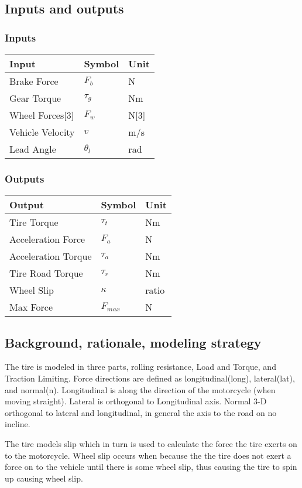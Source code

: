 \documentclass[../SimBALink.tex]{subfiles}
\begin{document}
\subsection{Inputs and outputs}
	\subsubsection{Inputs}
	\begin{tabular}{ l | l | l  }
		Input					&	Symbol		&	Unit		\\	\hline
		Brake Force				& 	$F_b$ 		&	N \\
		Gear Torque				&	$\tau_g$	&	Nm \\
		Wheel Forces[3]			&	$F_w$		&	N[3] \\
		Vehicle Velocity		&	$v$			&	m/s \\
		Lead Angle				&	$\theta_l$	&	rad \\
	\end{tabular}
	
	\subsubsection{Outputs}
	\begin{tabular}{ l | l | l  }
		Output					&	Symbol			&	Unit		\\	\hline
		Tire Torque				&	$\tau_t$		&	Nm \\
		Acceleration Force		&	$F_a$			&	N \\
		Acceleration Torque		&	$\tau_a$		&	Nm \\
		Tire Road Torque		&	$\tau_r$		&	Nm \\
		Wheel Slip				&	$\kappa$ 		&	ratio \\ 			
		Max Force 				&	$F_{max}$		&	N \\
	\end{tabular}

\subsection{Background, rationale, modeling strategy} The tire is modeled in three parts, rolling resistance, Load and Torque, and Traction Limiting. Force directions are defined as longitudinal(long), lateral(lat), and normal(n). Longitudinal is along the direction of the motorcycle (when moving straight). Lateral is orthogonal to Longitudinal axis. Normal 3-D orthogonal to lateral and longitudinal, in general the axis to the road on no incline.

The tire models slip which in turn is used to calculate the force the tire exerts on to the motorcycle. Wheel slip occurs when because the the tire does not exert a force on to the vehicle until there is some wheel slip, thus causing the tire to spin up causing wheel slip.
\end{document}
